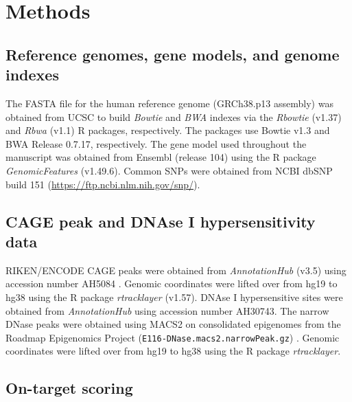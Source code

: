 \documentclass[pdftex,english,10pt]{article}
\begin{document}
\section*{Methods}



\subsection*{Reference genomes, gene models, and genome indexes}

The FASTA file for the human reference genome (GRCh38.p13 assembly) was obtained from UCSC to build \textit{Bowtie} and \textit{BWA} indexes via the \textit{Rbowtie} (v1.37) \citep{hahne2012rbowtie} and \textit{Rbwa} (v1.1) R packages, respectively. The packages use Bowtie v1.3 and BWA Release 0.7.17, respectively. 
The gene model used throughout the manuscript was obtained from Ensembl (release 104) using the R package \textit{GenomicFeatures} (v1.49.6).
Common SNPs were obtained from NCBI dbSNP build 151 (\url{https://ftp.ncbi.nlm.nih.gov/snp/}).

\subsection*{CAGE peak and DNAse I hypersensitivity data}

RIKEN/ENCODE CAGE peaks were obtained from \textit{AnnotationHub} (v3.5) using accession number AH5084 \citep{djebali2012landscape}. Genomic coordinates were lifted over from hg19 to hg38 using the R package \textit{rtracklayer} (v1.57). DNAse I hypersensitive sites were obtained from \textit{AnnotationHub} using accession number AH30743. The narrow DNase peaks were obtained using MACS2 on consolidated epigenomes from the Roadmap Epigenomics Project (\texttt{E116-DNase.macs2.narrowPeak.gz}) \citep{kundaje2015integrative}. Genomic coordinates were lifted over from hg19 to hg38 using the R package \textit{rtracklayer}.


\subsection*{On-target scoring}
\end{document}
